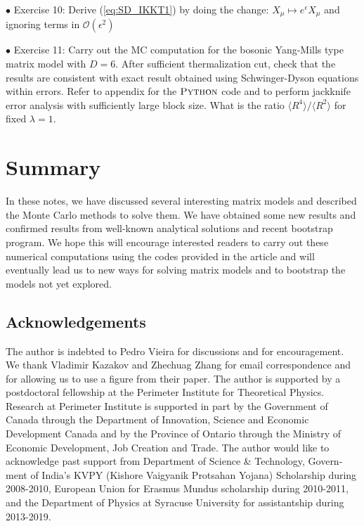 \documentclass[11pt]{article}
\begin{document}
\begin{mdframed}[backgroundcolor=blue!3] 
	\textsc{} 
	$\bullet$ Exercise 10: Derive (\ref{eq:SD_IKKT1}) by doing the change: $X_{\mu} \mapsto e^{\epsilon}X_{\mu}$ and ignoring terms in 
	$\mathcal{O}(\epsilon^{2})$
\end{mdframed}

\vspace{10mm} 

\begin{mdframed}[backgroundcolor=blue!3] 
	\textsc{} 
	$\bullet$ Exercise 11: Carry out the MC computation for the bosonic Yang-Mills type matrix model with $D=6$. After sufficient thermalization cut, check that the results are consistent with exact result obtained using Schwinger-Dyson equations within errors. Refer to appendix for the $\textsc{Python}$ code and to perform jackknife error analysis with sufficiently large block size. What is the ratio $\langle R^4 \rangle / \langle R^2 \rangle$ for fixed $\lambda=1$. 
\end{mdframed} 

\section{Summary}
In these notes, we have discussed several interesting matrix models and 
described the Monte Carlo methods to solve them. We have obtained some new 
results and confirmed results from well-known analytical solutions and recent 
bootstrap program. We hope this will encourage interested readers 
to carry out these numerical computations 
using the codes provided in the article 
and will eventually lead us to new ways for solving 
matrix models and to bootstrap the models not yet explored. 
\subsection*{Acknowledgements}
The author is indebted to Pedro Vieira
for discussions and for encouragement. We thank Vladimir Kazakov 
and Zhechuag Zhang for email correspondence and for allowing us to use a 
figure from their paper. The author is supported by a postdoctoral fellowship 
at the Perimeter Institute for Theoretical Physics. Research at Perimeter Institute is supported 
in part by the Government of Canada through the Department of Innovation, Science and 
Economic Development Canada and by the Province of Ontario through 
the Ministry of Economic Development, Job Creation and Trade.
The author would like to acknowledge past support from 
Department of Science \& Technology, Govern-
ment of India's KVPY (Kishore Vaigyanik Protsahan Yojana) Scholarship during 2008-2010, 
European Union for Erasmus Mundus scholarship during 2010-2011, 
and the Department of Physics at Syracuse University for 
assistantship during 2013-2019. 
\appendix
\end{document}
